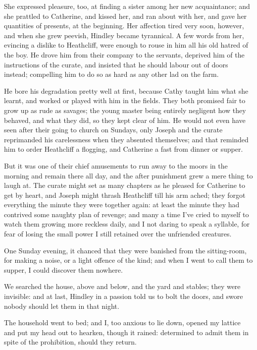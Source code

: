 \par She expressed pleasure, too, at finding a sister among her new acquaintance; and she prattled to Catherine, and kissed her, and ran about with her, and gave her quantities of presents, at the beginning. Her affection tired very soon, however, and when she grew peevish, Hindley became tyrannical. A few words from her, evincing a dislike to Heathcliff, were enough to rouse in him all his old hatred of the boy. He drove him from their company to the servants, deprived him of the instructions of the curate, and insisted that he should labour out of doors instead; compelling him to do so as hard as any other lad on the farm.
\par He bore his degradation pretty well at first, because Cathy taught him what she learnt, and worked or played with him in the fields. They both promised fair to grow up as rude as savages; the young master being entirely negligent how they behaved, and what they did, so they kept clear of him. He would not even have seen after their going to church on Sundays, only Joseph and the curate reprimanded his carelessness when they absented themselves; and that reminded him to order Heathcliff a flogging, and Catherine a fast from dinner or supper.
\par But it was one of their chief amusements to run away to the moors in the morning and remain there all day, and the after punishment grew a mere thing to laugh at. The curate might set as many chapters as he pleased for Catherine to get by heart, and Joseph might thrash Heathcliff till his arm ached; they forgot everything the minute they were together again: at least the minute they had contrived some naughty plan of revenge; and many a time I've cried to myself to watch them growing more reckless daily, and I not daring to speak a syllable, for fear of losing the small power I still retained over the unfriended creatures.
\par One Sunday evening, it chanced that they were banished from the sitting-room, for making a noise, or a light offence of the kind; and when I went to call them to supper, I could discover them nowhere.
\par We searched the house, above and below, and the yard and stables; they were invisible: and at last, Hindley in a passion told us to bolt the doors, and swore nobody should let them in that night.
\par The household went to bed; and I, too anxious to lie down, opened my lattice and put my head out to hearken, though it rained: determined to admit them in spite of the prohibition, should they return.
